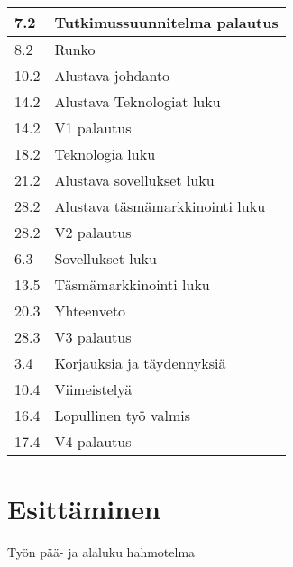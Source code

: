 \documentclass[12pt,a4paper,finnish,oneside]{article}
\begin{document}
\begin{tabular}{|p{30mm}|p{120mm}|}
\hline
7.2	& Tutkimussuunnitelma palautus\\ \hline
8.2	& Runko \\ \hline
10.2 	&Alustava johdanto \\ \hline
14.2  	& Alustava Teknologiat luku \\ \hline
14.2   & V1 palautus \\ \hline
18.2   & Teknologia luku \\ \hline
21.2   & Alustava sovellukset luku \\ \hline
28.2   & Alustava täsmämarkkinointi luku \\ \hline
28.2   & V2 palautus \\ \hline
6.3	&Sovellukset luku \\ \hline
13.5	&Täsmämarkkinointi luku \\ \hline
20.3	&Yhteenveto \\ \hline
28.3   & V3 palautus \\ \hline
3.4  	& Korjauksia ja täydennyksiä \\ \hline
10.4  	&Viimeistelyä \\ \hline
16.4   &Lopullinen työ valmis \\ \hline
17.4	&V4 palautus \\ \hline
\end{tabular}


\section{Esittäminen}
Työn pää- ja alaluku hahmotelma
\end{document}
